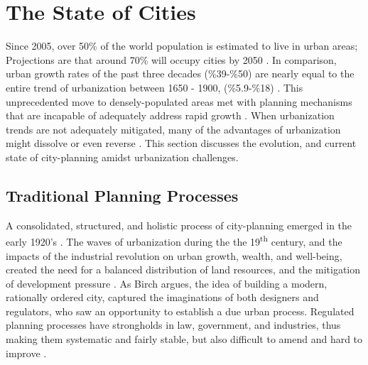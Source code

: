 \section{The State of Cities}\label{sec:stateofcities}
{
    Since 2005, over 50\% of the world population is estimated to live in urban areas; Projections are that around 70\% will occupy cities by 2050 \cite{united2018world}. In comparison, urban growth rates of the past three decades (\%39-\%50) are nearly equal to the entire trend of urbanization between 1650 - 1900, (\%5.9-\%18) \cite{grauman1976orders, chen2014global}. This unprecedented move to densely-populated areas met with planning mechanisms that are incapable of adequately address rapid growth \cite{Glaeser2011, united2018world}. When urbanization trends are not adequately mitigated, many of the advantages of urbanization might dissolve or even reverse \cite{chen2014global}. This section discusses the evolution, and current state of city-planning amidst urbanization challenges.


    \subsection{Traditional Planning Processes}
    {
        A consolidated, structured, and holistic process of city-planning emerged in the early 1920's \cite{banerjee2011companion}. The waves of urbanization during the the 19\textsuperscript{th} century, and the impacts of the industrial revolution on urban growth, wealth, and well-being, created the need for a balanced distribution of land resources, and the mitigation of development pressure \cite{Glaeser2011}. As Birch argues, the idea of building a modern, rationally ordered city, captured the imaginations of both designers and regulators, who saw an opportunity to establish a due urban process. Regulated planning processes have strongholds in law, government, and industries, thus making them systematic and fairly stable, but also difficult to amend and hard to improve \cite{banerjee2011companion}.

}}
